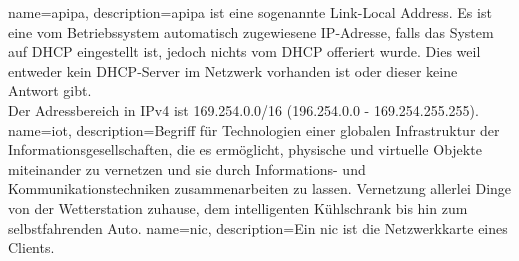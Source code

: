 


{
  name={\acrlong{apipa}},
  description={\acrfull{apipa} ist eine sogenannte Link-Local Address. Es ist eine vom Betriebssystem automatisch zugewiesene IP-Adresse, falls das System auf DHCP eingestellt ist, jedoch nichts vom DHCP offeriert wurde. Dies weil entweder kein DHCP-Server im Netzwerk vorhanden ist oder dieser keine Antwort gibt.\\Der Adressbereich in IPv4 ist 169.254.0.0/16 (196.254.0.0 - 169.254.255.255).}
}
{
  name={\acrlong{iot}},
  description={Begriff für Technologien einer globalen Infrastruktur der Informationsgesellschaften, die es ermöglicht, physische und virtuelle Objekte miteinander zu vernetzen und sie durch Informations- und Kommunikationstechniken zusammenarbeiten zu lassen. Vernetzung allerlei Dinge von der Wetterstation zuhause, dem intelligenten Kühlschrank bis hin zum selbstfahrenden Auto.}
}
{
  name={\acrlong{nic}},
  description={Ein \acrshort{nic} ist die Netzwerkkarte eines Clients.}
}